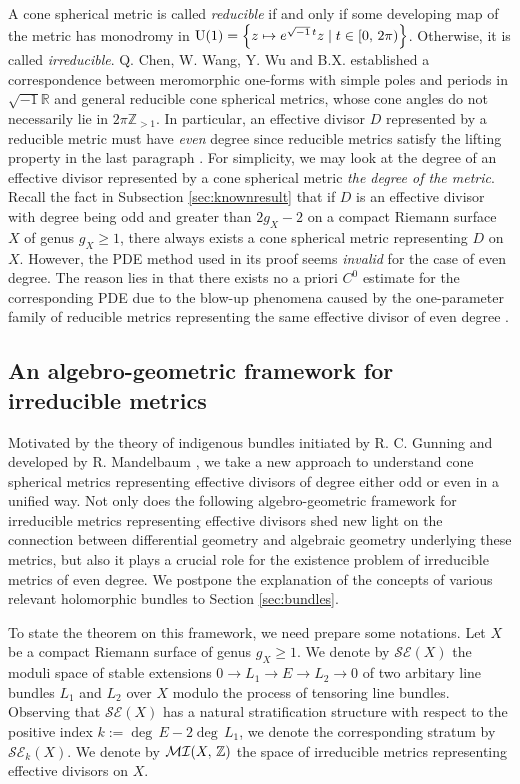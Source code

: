 \documentclass[12pt]{article}
\begin{document}
A cone spherical metric  is called {\it reducible} if and only if some developing map of the metric has monodromy in ${\rm U}(1) = \left\{ z \mapsto e^{\sqrt{-1}\, t}z \mid t \in [0, \, 2\pi) \right\}$. Otherwise, it is called {\it irreducible}. Q. Chen, W. Wang, Y. Wu and B.X. \cite[Theorems 1.4-5]{CWWX2015} established a correspondence between meromorphic one-forms with simple poles and periods  in $\sqrt{-1}\mathbb{R}$ and general reducible cone spherical metrics, whose cone angles do not necessarily lie in $2\pi \mathbb{Z}_{>1}$. In particular, an effective divisor $D$ represented by a reducible metric must have {\it even} degree since reducible metrics satisfy the lifting property in the last paragraph \cite[Lemma 4.1]{CWWX2015}. For simplicity, we may look at the degree of an effective divisor represented by a cone spherical metric {\it the degree of the metric}. Recall the fact in Subsection \ref{sec:knownresult} that if $D$ is an effective divisor with degree being odd and greater than $2g_X-2$ on a compact Riemann surface $X$ of genus $g_X \geq 1$, there always exists a cone spherical metric representing $D$ on $X$. However,  the PDE method used in its proof seems {\it invalid} for the case of even degree. The reason lies in that there exists no a priori $C^0$ estimate for the corresponding PDE due to the blow-up phenomena caused by the one-parameter family of reducible metrics representing the same effective divisor of even degree \cite[Theorems 1.4-5]{CWWX2015}.

\subsection{An algebro-geometric framework for irreducible metrics}

Motivated by the theory of indigenous bundles initiated by R. C. Gunning \cite{Gunning67} and developed by  R. Mandelbaum \cite{Mand72,Mand73}, we take a new approach to understand cone spherical metrics representing effective divisors of degree either odd or even in a unified way.
Not only does the following algebro-geometric framework for irreducible metrics representing effective divisors shed new light on the connection between differential geometry and algebraic geometry underlying these metrics, but also it plays a crucial role for the existence problem of irreducible metrics of even degree. We postpone the explanation of the concepts of various relevant holomorphic bundles to Section \ref{sec:bundles}.

To state the theorem on this framework, we need prepare some notations. Let $X$ be a compact Riemann surface of genus $g_X\geq 1$. We denote by ${\mathcal {SE}}(X)$ the moduli space of stable extensions $0\to L_1\to E\to L_2\to 0$ of two arbitary line bundles $L_1$ and $L_2$ over $X$ modulo the process of tensoring line bundles. Observing that ${\mathcal {SE}}(X)$ has a natural stratification structure with respect to the positive index $k:=\deg\, E-2\deg\,L_1$, we denote the corresponding stratum by ${\mathcal {SE}}_k(X)$. We denote
by ${\mathcal {MI}}(X,\,{\Bbb Z})$ the space of irreducible metrics representing effective divisors on $X$.
\end{document}
